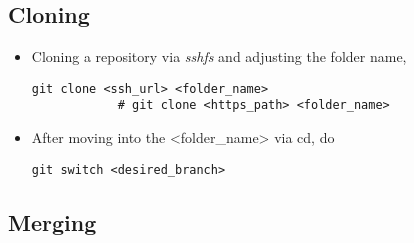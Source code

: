 \documentclass[12pt, a4paper]{article}
\numberwithin{equation}{section}
\theoremstyle{definition}
\theoremstyle{definition}
\begin{document}
	\subsection{Cloning}
	\begin{itemize}
		\item Cloning a repository via \textit{sshfs} and adjusting the folder name, 
		\begin{lstlisting}[style=mystylebash, label=alg:cloning1, xleftmargin=\parindent]
			git clone <ssh_url> <folder_name>
			# git clone <https_path> <folder_name>
		\end{lstlisting}
	
		\item After moving into the <folder_name> via cd, do 
		\begin{lstlisting}[style=mystylebash, label=alg:cloning3, xleftmargin=\parindent]
			git switch <desired_branch>
		\end{lstlisting}
	\end{itemize}
	
	\subsection{Merging}
	
\end{document}
